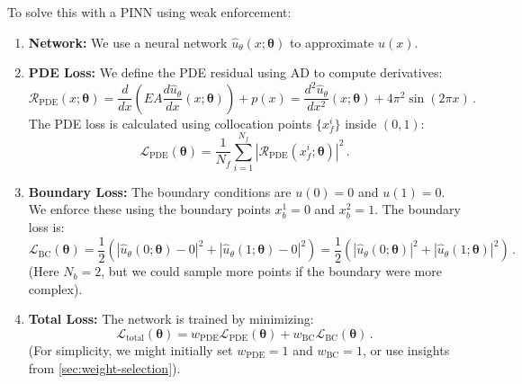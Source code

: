 

To solve this with a PINN using weak enforcement:
\begin{enumerate}
    \item \textbf{Network:} We use a neural network $\hat{u}_\theta(x; \boldsymbol{\theta})$ to approximate $u(x)$.
    \item \textbf{PDE Loss:} We define the PDE residual using AD to compute derivatives:
    \begin{equation*}
    \mathcal{R}_{\text{PDE}}(x; \boldsymbol{\theta}) = \frac{d}{dx}\left(EA\frac{d\hat{u}_\theta}{dx}(x; \boldsymbol{\theta})\right) + p(x) = \frac{d^2\hat{u}_\theta}{dx^2}(x; \boldsymbol{\theta}) + 4\pi^2\sin(2\pi x)\,.
    \end{equation*}
    The PDE loss is calculated using collocation points $\{x_f^i\}$ inside $(0,1)$:
    \begin{equation*}
    \mathcal{L}_{\text{PDE}}(\boldsymbol{\theta}) = \frac{1}{N_f}\sum_{i=1}^{N_f}|\mathcal{R}_{\text{PDE}}(x_f^i; \boldsymbol{\theta})|^2\,.
    \end{equation*}
    \item \textbf{Boundary Loss:} The boundary conditions are $u(0)=0$ and $u(1)=0$. We enforce these using the boundary points $x_b^1=0$ and $x_b^2=1$. The boundary loss is:
    \begin{equation*}
    \mathcal{L}_{\text{BC}}(\boldsymbol{\theta}) = \frac{1}{2} \left( |\hat{u}_\theta(0; \boldsymbol{\theta}) - 0|^2 + |\hat{u}_\theta(1; \boldsymbol{\theta}) - 0|^2 \right) = \frac{1}{2} \left( |\hat{u}_\theta(0; \boldsymbol{\theta})|^2 + |\hat{u}_\theta(1; \boldsymbol{\theta})|^2 \right)\,.
    \end{equation*}
    (Here $N_b=2$, but we could sample more points if the boundary were more complex).
    \item \textbf{Total Loss:} The network is trained by minimizing:
    \begin{equation*}
    \mathcal{L}_{\text{total}}(\boldsymbol{\theta}) = w_{\text{PDE}}\mathcal{L}_{\text{PDE}}(\boldsymbol{\theta}) + w_{\text{BC}}\mathcal{L}_{\text{BC}}(\boldsymbol{\theta})\,.
    \end{equation*}
    (For simplicity, we might initially set $w_{\text{PDE}}=1$ and $w_{\text{BC}}=1$, or use insights from \cref{sec:weight-selection}).
\end{enumerate}

